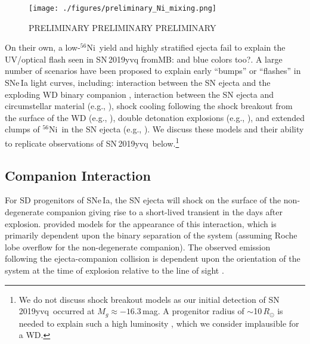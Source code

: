 \documentclass[twocolumn]{aastex63}
\newcommand{\frommark}[1]{{\color{orange} fromMM: {#1}}}
\newcommand{\frommb}[1]{{\color{purple} fromMB: {#1}}}
\newcommand{\radni}{$^{56}$Ni}
\newcommand{\sn}{SN\,2019yvq}
\begin{document}

\begin{figure}
    \centering
    \texttt{[image: ./figures/preliminary\_Ni\_mixing.png]}
    \caption{PRELIMINARY PRELIMINARY PRELIMINARY}
    \label{fig:Ni_mixing}
\end{figure}

On their own, a low-\radni\ yield and highly stratified ejecta fail to explain
the UV/optical flash seen in \sn \frommb{and blue colors too?}. A large number of scenarios have been
proposed to explain early ``bumps'' or ``flashes'' in SNe\,Ia light curves,
including: interaction between the SN ejecta and the exploding WD binary
companion \citep{Kasen10a}, interaction between the SN ejecta and
circumstellar material (e.g., \citealt{Dessart14,Piro16}), shock cooling
following the shock breakout from the surface of the WD (e.g.,
\citealt{Piro10,Rabinak11}), double detonation explosions (e.g.,
\citealt{Noebauer17,Polin19}), and extended clumps of \radni\ in the SN ejecta
(e.g., \citealt{Shappee19,Dimitriadis19}). We discuss these models and their
ability to replicate observations of \sn\ below.\footnote{We do not discuss
shock breakout models as our initial detection of \sn\ occurred at $M_g
\approx -16.3$\,mag. A progenitor radius of $\sim$10$\,R_\odot$ is needed to
explain such a high luminosity \citep{Piro10,Rabinak11}, which we consider
implausible for a WD.}

\subsection{Companion Interaction}

For SD progenitors of SNe\,Ia, the SN ejecta will shock on the surface of the
non-degenerate companion giving rise to a short-lived transient in the days
after explosion. \citet{Kasen10a} provided models for the appearance of this
interaction, which is primarily dependent upon the binary separation of the
system (assuming Roche lobe overflow for the non-degenerate companion). The
observed emission following the ejecta-companion collision is dependent upon
the orientation of the system at the time of explosion relative to the line of
sight \citep{Kasen10a}.
\end{document}
